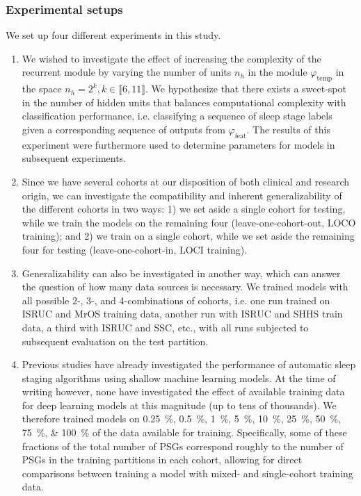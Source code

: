 \subsubsection{Experimental setups}\label{sec:sleep-stages:paper-ii:experimental-setup}
We set up four different experiments in this study.
\begin{enumerate}
    \item We wished to investigate the effect of increasing the complexity of the recurrent module by varying the number of units $n_h$ in the module $\varphi_{\mathrm{temp}}$ in the space $n_h=2^k, k \in \llbracket 6, 11 \rrbracket$.
    We hypothesize that there exists a sweet-spot in the number of hidden units that balances computational complexity with classification performance, i.e. classifying a sequence of sleep stage labels given a corresponding sequence of outputs from $\varphi_{\mathrm{feat}}$.
    The results of this experiment were furthermore used to determine parameters for models in subsequent experiments.
    \item Since we have several cohorts at our disposition of both clinical and research origin, we can investigate the compatibility and inherent generalizability of the different cohorts in two ways: 1) we set aside a single cohort for testing, while we train the models on the remaining four (leave-one-cohort-out, \ac{LOCO} training); and 2) we train on a single cohort, while we set aside the remaining four for testing (leave-one-cohort-in, \ac{LOCI} training).
    \item Generalizability can also be investigated in another way, which can answer the question of how many data sources is necessary.
    We trained models with all possible 2-, 3-, and 4-combinations of cohorts, i.e. one run trained on \ac{ISRUC} and \ac{MrOS} training data, another run with \ac{ISRUC} and \ac{SHHS} train data, a third with \ac{ISRUC} and \ac{SSC}, etc., with all runs subjected to subsequent evaluation on the test partition. 
    \item Previous studies have already investigated the performance of automatic sleep staging algorithms using shallow machine learning models.
    At the time of writing however, none have investigated the effect of available training data for deep learning models at this magnitude (up to tens of thousands).
    We therefore trained models on \SIlist{0.25;0.5;1;5;10;25;50;75;100}{\percent} of the data available for training.
    Specifically, some of these fractions of the total number of \acp{PSG} correspond roughly to the number of \acp{PSG} in the training partitions in each cohort, allowing for direct comparisons between training a model with mixed- and single-cohort training data.
\end{enumerate}

